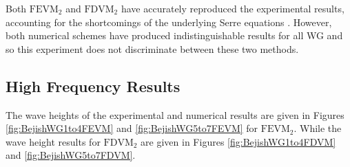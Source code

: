 Both $\text{FEVM}_2$ and $\text{FDVM}_2$ have accurately reproduced the experimental results, accounting for the shortcomings of the underlying Serre equations \cite{Beji-Battjes-1994-1,Lannes-2013}. However, both numerical schemes have produced indistinguishable results for all WG and so this experiment does not discriminate between these two methods. 

\subsection{High Frequency Results}
The wave heights of the experimental and numerical results are given in Figures \ref{fig:BejishWG1to4FEVM} and \ref{fig:BejishWG5to7FEVM} for $\text{FEVM}_2$. While the wave height results for $\text{FDVM}_2$ are given in Figures \ref{fig:BejishWG1to4FDVM} and \ref{fig:BejishWG5to7FDVM}.
%
